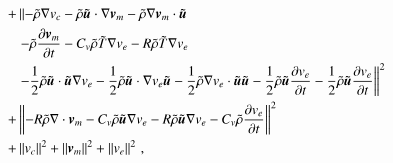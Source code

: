 \documentclass[preprint,12pt]{elsarticle}
\begin{document}
\begin{equation}
\begin{aligned}
+&\left\|
-\tilde\rho\nabla v_c
-\tilde\rho\tilde{\boldsymbol u}\cdot\nabla\boldsymbol v_m-\tilde\rho\nabla\boldsymbol v_m\cdot\tilde{\boldsymbol u}
\right.\\
&\left.
-\tilde\rho\frac{\partial\boldsymbol v_m}{\partial t}
-C_v\tilde\rho\tilde T\nabla v_e
-R\tilde\rho\tilde T\nabla v_e
\right.\\
&\left.
-\frac{1}{2}\tilde\rho\tilde{\boldsymbol u}\cdot\tilde{\boldsymbol u}\nabla v_e
-\frac{1}{2}\tilde\rho\tilde{\boldsymbol u}\cdot\nabla v_e\tilde{\boldsymbol u}
-\frac{1}{2}\tilde\rho\nabla v_e\cdot\tilde{\boldsymbol u}\tilde{\boldsymbol u}
-\frac{1}{2}\tilde\rho\tilde{\boldsymbol u}\frac{\partial v_e}{\partial t}
-\frac{1}{2}\tilde\rho\tilde{\boldsymbol u}\frac{\partial v_e}{\partial t}
\right\|^2\\
+&\left\|
-R\tilde\rho\nabla\cdot\boldsymbol v_m
-C_v\tilde\rho\tilde{\boldsymbol u}\nabla v_e
-R\tilde\rho\tilde{\boldsymbol u}\nabla v_e
-C_v\tilde\rho\frac{\partial v_e}{\partial t}
\right\|^2\\
+&\left\| v_c \right\|^2
+\left\| \boldsymbol v_m \right\|^2
+\left\| v_e \right\|^2
\,,
\end{aligned}
\end{equation}
\end{document}
